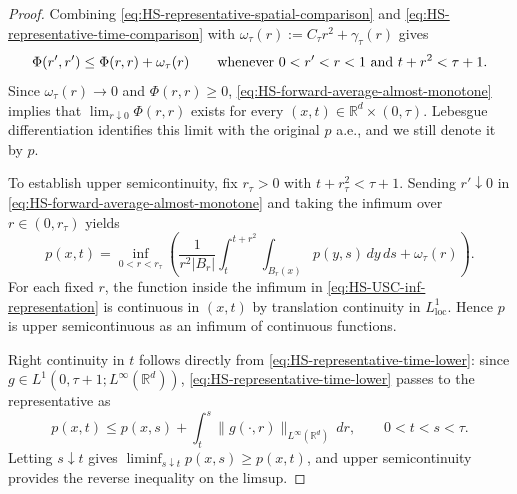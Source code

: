 \documentclass[11pt]{amsart}
\numberwithin{equation}{section}
\numberwithin{figure}{section}
\theoremstyle{plain}
\theoremstyle{definition}
\theoremstyle{remark}
\theoremstyle{plain}
\newcommand{\abs}[1]{\lvert #1 \rvert}
\newcommand{\norm}[1]{\lVert #1 \rVert}
\def\R{\mathbb{R}}
\begin{document}
\begin{proof}
Combining \eqref{eq:HS-representative-spatial-comparison} and
\eqref{eq:HS-representative-time-comparison} with
\(\omega_\tau(r):=C_\tau r^2+\gamma_\tau(r)\) gives
\begin{equation}\label{eq:HS-forward-average-almost-monotone}
    \Phi(r',r')\leq \Phi(r,r)+\omega_\tau(r)
    \qquad\hbox{whenever }0<r'<r<1\hbox{ and }t+r^2<\tau+1 .
\end{equation}
Since \(\omega_\tau(r)\to0\) and \(\Phi(r,r)\geq0\),
\eqref{eq:HS-forward-average-almost-monotone} implies that
\(\lim_{r\downarrow0}\Phi(r,r)\) exists for every
\((x,t)\in\R^d\times(0,\tau)\).  Lebesgue differentiation identifies this
limit with the original \(p\) a.e., and we still denote it by \(p\).

To establish upper semicontinuity, fix \(r_\tau>0\) with
\(t+r_\tau^2<\tau+1\).  Sending \(r'\downarrow0\) in
\eqref{eq:HS-forward-average-almost-monotone} and taking the infimum over
\(r\in(0,r_\tau)\) yields
\begin{equation}\label{eq:HS-USC-inf-representation}
    p(x,t)=\inf_{0<r<r_\tau}
    \left(
    \frac{1}{r^2\abs{B_r}}
    \int_t^{t+r^2}\int_{B_r(x)}p(y,s)\,dy\,ds
    +\omega_\tau(r)\right).
\end{equation}
For each fixed \(r\), the function inside the infimum in
\eqref{eq:HS-USC-inf-representation} is continuous in \((x,t)\) by
translation continuity in \(L^1_{\operatorname{loc}}\).  Hence \(p\) is upper
semicontinuous as an infimum of continuous functions.

Right continuity in \(t\) follows directly from
\eqref{eq:HS-representative-time-lower}: since \(g\in L^1(0,\tau+1;L^\infty(\R^d))\),
\eqref{eq:HS-representative-time-lower} passes to the representative as
\[
    p(x,t)\leq p(x,s)+\int_t^s\norm{g(\cdot,r)}_{L^\infty(\R^d)}\,dr,
    \qquad 0<t<s<\tau .
\]
Letting \(s\downarrow t\) gives \(\liminf_{s\downarrow t}p(x,s)\geq
p(x,t)\), and upper semicontinuity provides the reverse inequality on the
limsup.


\end{proof}
\end{document}
